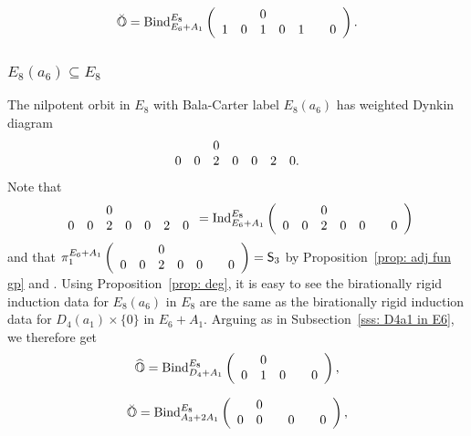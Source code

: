 \documentclass[11pt]{amsart}
\renewcommand{\O}{{\mathbb O}}
\newcommand{\Sym}{{\mathsf{S}}}
\newcommand{\Ind}{{{\mbox{\rm Ind}}}}
\newcommand{\BInd}{{{\mbox{\rm Bind}}}}
\newcommand{\hatO}{\widehat{\O}}
\newcommand{\breveO}{\breve{\O}}
\numberwithin{equation}{section}
\begin{document}
	$$\breveO=\BInd_{E_6 + A_1}^{E_8}\left(\begin{array}{c c c c c c c}
		& & 0 & & & &  \\
		1 & 0 & 1 & 0 & 1 & & 0  \\
	\end{array}\right).$$
	
	
	\subsubsection{\texorpdfstring{$E_8(a_6)\subseteq E_8$}{E8a6 in E8}}\label{sss: E8a6 in E8}
	
	The nilpotent orbit in $E_8$ with Bala-Carter label $E_8(a_6)$ has weighted Dynkin diagram
	$$\begin{array}{c c c c c c c}
		& & 0 & & & &  \\
		0 & 0 & 2 & 0 & 0 & 2 & 0. \\
	\end{array}$$ Note that $$\begin{array}{c c c c c c c}
		& & 0 & & & &  \\
		0 & 0 & 2 & 0 & 0 & 2 & 0 \\
	\end{array}=\Ind_{E_6 + A_1}^{E_8}\left(\begin{array}{c c c c c c c}
		& & 0 & & & & \\
		0 & 0 & 2 & 0 & 0 & & 0 \\
	\end{array}\right)$$ and that $\pi_1^{E_6 + A_1}\left(\begin{array}{c c c c c c c}
		& & 0 & & & & \\
		0 & 0 & 2 & 0 & 0 & & 0 \\
	\end{array}\right)=\Sym_3$ by Proposition~\ref{prop: adj fun gp} and \cite[\S 8.4]{CM}. Using Proposition~\ref{prop: deg}, it is easy to see the birationally rigid induction data for $E_8(a_6)$ in $E_8$ are the same as the birationally rigid induction data for $D_4(a_1)\times\{0\}$ in $E_6 + A_1$. Arguing as in Subsection~\ref{sss: D4a1 in E6}, we therefore get
	$$\hatO=\BInd_{D_4 + A_1}^{E_8}\left(\begin{array}{c c c c c}
		& 0 & & &\\
		0 & 1 & 0 & & 0 \\
	\end{array}\right),$$
	
	$$\breveO=\BInd_{A_3 + 2 A_1}^{E_8}\left(\begin{array}{c c c c c c}
		& 0 & & & & \\
		0 & 0 &  & 0 & & 0 \\
	\end{array}\right),$$
	
\end{document}
